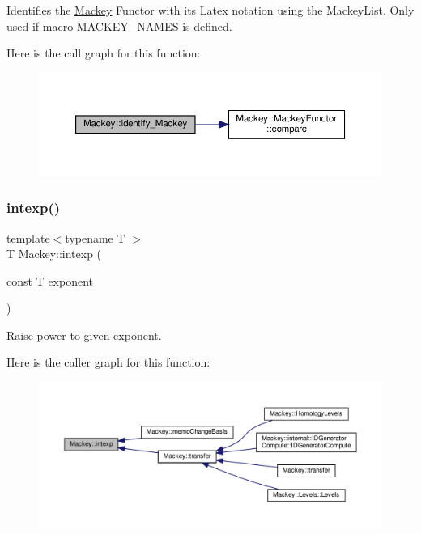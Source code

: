 Identifies the \hyperlink{namespaceMackey}{Mackey} Functor with its Latex notation using the Mackey\+List. Only used if macro M\+A\+C\+K\+E\+Y\+\_\+\+N\+A\+M\+ES is defined. 

Here is the call graph for this function\+:\nopagebreak
\begin{figure}[H]
\begin{center}
\leavevmode
\includegraphics[width=350pt]{namespaceMackey_ad0ca46ae450950b13360c44a2de1cb43_cgraph}
\end{center}
\end{figure}
\mbox{\label{namespaceMackey_a4904fdc0fdcf3c23d7f3b80f59b2eafa}} 
\subsubsection{\texorpdfstring{intexp()}{intexp()}}
{\footnotesize\ttfamily template$<$typename T $>$ \\
T Mackey\+::intexp (\begin{DoxyParamCaption}\item[{const T}]{exponent }\end{DoxyParamCaption})\hspace{0.3cm}{\ttfamily [inline]}}



Raise power to given exponent. 

Here is the caller graph for this function\+:\nopagebreak
\begin{figure}[H]
\begin{center}
\leavevmode
\includegraphics[width=350pt]{namespaceMackey_a4904fdc0fdcf3c23d7f3b80f59b2eafa_icgraph}
\end{center}
\end{figure}
\mbox{\label{namespaceMackey_aa0cac9097035c5fe8448742e22e6f78b}} 
